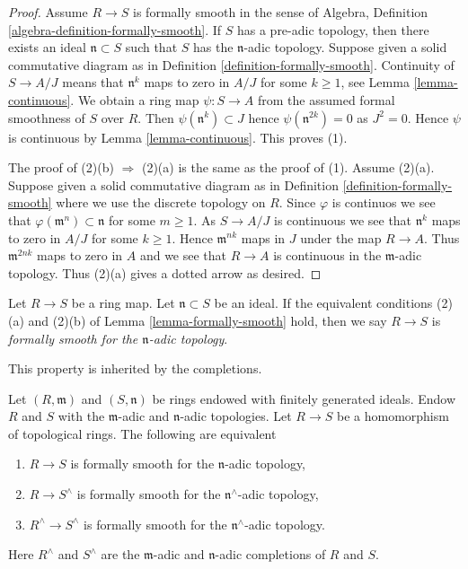 \begin{proof}
Assume $R \to S$ is formally smooth in
the sense of Algebra, Definition \ref{algebra-definition-formally-smooth}.
If $S$ has a pre-adic topology, then
there exists an ideal $\mathfrak n \subset S$ such that $S$ has the
$\mathfrak n$-adic topology. Suppose given a solid commutative diagram as in
Definition \ref{definition-formally-smooth}.
Continuity of $S \to A/J$ means that $\mathfrak n^k$ maps to zero
in $A/J$ for some $k \geq 1$, see Lemma \ref{lemma-continuous}.
We obtain a ring map $\psi : S \to A$ from the assumed formal smoothness of
$S$ over $R$. Then $\psi(\mathfrak n^k) \subset J$ hence
$\psi(\mathfrak n^{2k}) = 0$ as $J^2 = 0$. Hence $\psi$ is continuous by
Lemma \ref{lemma-continuous}. This proves (1).

\medskip\noindent
The proof of (2)(b) $\Rightarrow$ (2)(a) is the same as the proof of (1).
Assume (2)(a). Suppose given a solid commutative diagram as in
Definition \ref{definition-formally-smooth} where we use the discrete
topology on $R$. Since $\varphi$ is continuos we see that
$\varphi(\mathfrak m^n) \subset \mathfrak n$ for some $m \geq 1$.
As $S \to A/J$ is continuous we see that $\mathfrak n^k$ maps to
zero in $A/J$ for some $k \geq 1$. Hence $\mathfrak m^{nk}$ maps
in $J$ under the map $R \to A$. Thus $\mathfrak m^{2nk}$ maps to zero
in $A$ and we see that $R \to A$ is continuous in the $\mathfrak m$-adic
topology. Thus (2)(a) gives a dotted arrow as desired.
\end{proof}

\begin{definition}
\label{definition-formally-smooth-adic}
Let $R \to S$ be a ring map. Let $\mathfrak n \subset S$ be an
ideal. If the equivalent conditions (2)(a) and (2)(b) of
Lemma \ref{lemma-formally-smooth} hold, then we say
$R \to S$ is {\it formally smooth for the $\mathfrak n$-adic topology}.
\end{definition}

\noindent
This property is inherited by the completions.

\begin{lemma}
\label{lemma-formally-smooth-completion}
Let $(R, \mathfrak m)$ and $(S, \mathfrak n)$ be rings endowed
with finitely generated ideals. Endow $R$ and $S$ with the
$\mathfrak m$-adic and $\mathfrak n$-adic topologies.
Let $R \to S$ be a homomorphism of topological rings.
The following are equivalent
\begin{enumerate}
\item $R \to S$ is formally smooth for the $\mathfrak n$-adic topology,
\item $R \to S^\wedge$ is formally smooth for the $\mathfrak n^\wedge$-adic
topology,
\item $R^\wedge \to S^\wedge$ is formally smooth for the
$\mathfrak n^\wedge$-adic topology.
\end{enumerate}
Here $R^\wedge$ and $S^\wedge$ are the $\mathfrak m$-adic and
$\mathfrak n$-adic completions of $R$ and $S$.
\end{lemma}

